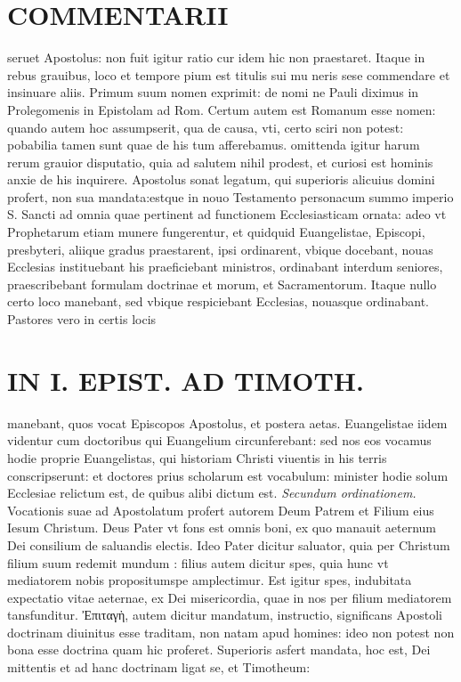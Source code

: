 \documentclass{article}
\begin{document}
\begin{pages}
\section*{COMMENTARII }
\marginpar{[ p.10 ]}\pstart seruet Apostolus: non fuit igitur ratio cur idem hic non praestaret. Itaque in rebus grauibus, loco et tempore pium est titulis sui mu neris sese commendare et insinuare aliis.  \pend\pstart Primum suum nomen exprimit: de nomi ne Pauli diximus in Prolegomenis in Epistolam ad Rom. Certum autem est Romanum esse nomen: quando autem hoc assumpserit, qua de causa, vti, certo sciri non potest: pobabilia tamen sunt quae de his tum afferebamus. omittenda igitur harum rerum grauior disputatio, quia ad salutem nihil prodest, et curiosi est hominis anxie de his inquirere.  \pend\pstart Apostolus sonat legatum, qui superioris alicuius domini profert, non sua mandata:estque in nouo Testamento personacum summo imperio S. Sancti ad omnia quae pertinent ad functionem Ecclesiasticam ornata: adeo vt Prophetarum etiam munere fungerentur, et quidquid Euangelistae, Episcopi, presbyteri, aliique gradus praestarent, ipsi ordinarent, vbique docebant, nouas Ecclesias instituebant his praeficiebant ministros, ordinabant interdum seniores, praescribebant formulam doctrinae et morum, et Sacramentorum. Itaque nullo certo loco manebant, sed vbique respiciebant Ecclesias, nouasque ordinabant. Pastores vero in certis locis  \pend
\section*{IN I. EPIST. AD TIMOTH. }
\marginpar{[ p.11 ]}\pstart manebant, quos vocat Episcopos Apostolus, et postera aetas. Euangelistae iidem videntur cum doctoribus qui Euangelium circunferebant: sed nos eos vocamus hodie proprie Euangelistas, qui historiam Christi viuentis in his terris conscripserunt: et doctores prius scholarum est vocabulum: minister hodie solum Ecclesiae relictum est, de quibus alibi dictum est.  \pend
\textit{Secundum ordinationem. }\pstart Vocationis suae ad Apostolatum profert autorem Deum Patrem et Filium eius Iesum Christum. Deus Pater vt fons est omnis boni, ex quo manauit aeternum Dei consilium de saluandis electis. Ideo Pater dicitur saluator, quia per Christum filium suum redemit mundum : filius autem dicitur spes, quia hunc vt mediatorem nobis propositumspe amplectimur. Est igitur spes, indubitata expectatio vitae aeternae, ex Dei misericordia, quae in nos per filium mediatorem tansfunditur.  \pend\pstart Ἐπιταγὴ, autem dicitur mandatum, instructio, significans Apostoli doctrinam diuinitus esse traditam, non natam apud homines: ideo non potest non bona esse doctrina quam hic proferet. Superioris asfert mandata, hoc est, Dei mittentis et ad hanc doctrinam ligat se, et Timotheum:  \pend

\end{pages}
\end{document}
